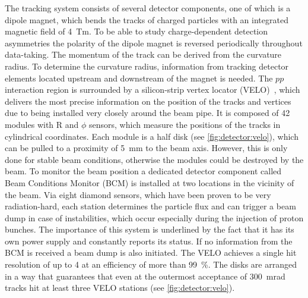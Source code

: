 The tracking system consists of several detector components, one of which is a
dipole magnet, which bends the tracks of charged particles with an integrated
magnetic field of \SI{4}{Tm}. To be able to study charge-dependent detection
asymmetries the polarity of the dipole magnet is reversed periodically
throughout data-taking. The momentum of the track can be derived from the
curvature radius. To determine the curvature radius, information from tracking
detector elements located upstream and downstream of the magnet is needed. The
$pp$ interaction region is surrounded by a silicon-strip vertex locator
(VELO)~\cite{LHCb-DP-2014-001}, which delivers the most precise information on
the position of the tracks and vertices due to being installed very closely
around the beam pipe. It is composed of 42 modules with R and $\phi$ sensors,
which measure the positions of the tracks in cylindrical coordinates. Each
module is a half disk (see \cref{fig:detector:velo}), which can be pulled to a
proximity of \SI{5}{\milli\metre} to the beam axis. However, this is only done
for stable beam conditions, otherwise the modules could be destroyed by the
beam. To monitor the beam position a dedicated detector component called Beam
Conditions Monitor (BCM) is installed at two locations in the vicinity of the
beam. Via eight diamond sensors, which have been proven to be very
radiation-hard, each station determines the particle flux and can trigger a
beam dump in case of instabilities, which occur especially during the
injection of proton bunches. The importance of this system is underlined by
the fact that it has its own power supply and constantly reports its status.
If no information from the BCM is received a beam dump is also initiated. The
VELO achieves a single hit resolution of up to \SI{4}{\mum} at an efficiency
of more than \SI{99}{\percent}. The disks are arranged in a way that
guarantees that even at the outermost acceptance of \SI{300}{mrad} tracks hit
at least three VELO stations (see \cref{fig:detector:velo}).
